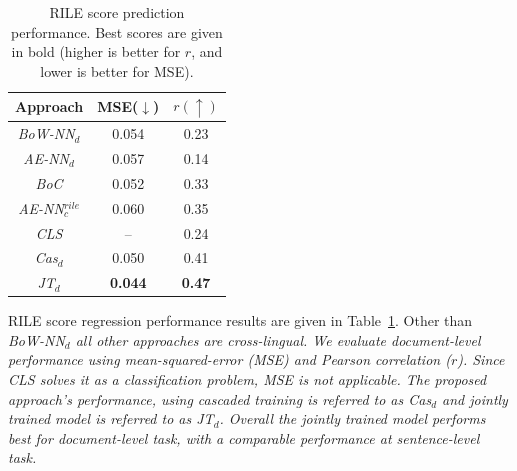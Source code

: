 \documentclass[11pt,a4paper]{article}
\newcommand{\tabref}[2][]{Table#1~\ref{#2}\xspace}
\begin{document}
 \begin{table}[!t]
  \centering
  \begin{tabular}{ c c c }
  \toprule
    Approach & MSE($\downarrow$) & $r(\uparrow)$\\
    \midrule
    \em{BoW-NN}$_{d}$  &   0.054 & 0.23\\
    \em{AE-NN}$_{d}$    & 0.057 & 0.14\\
    \em{BoC}    &  0.052 & 0.33\\
    \em{AE-NN}$_{c}^{rile}$   & 0.060 & 0.35\\
    \em{CLS}   & -- & 0.24\\
    \em{Cas}$_{d}$  &  0.050 & 0.41 \\
    \em{JT}$_{d}$ &  \textbf{0.044} & \textbf{0.47} \\
    \bottomrule
  \end{tabular}
  \caption{RILE score prediction performance. Best scores are given in bold %
(higher is better for $r$, and lower is better for MSE).}
  \label{tab:al1}
\end{table}

RILE score regression performance results are given in \tabref{tab:al1}.  Other than \em{BoW-NN$_{d}$} \rm all other approaches are cross-lingual.   We evaluate document-level performance using mean-squared-error (MSE) and Pearson correlation ($r$). Since \em{CLS} \rm solves it as a classification problem, MSE is not applicable. The proposed approach's performance, using cascaded training  is referred to as \em{Cas}$_{d}$ \rm and jointly trained model is referred to as \em{JT}$_{d}$. \rm Overall the jointly trained model performs best for document-level task, with a comparable performance at sentence-level task. 

\end{document}
